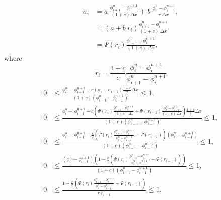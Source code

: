 \documentclass[../thesis.tex]{subfiles}
\begin{document}
\newpage
\begin{equation}
    \begin{split}
        \sigma_{i} &= a~\frac{\phi_{i+1}^{n}-\phi_{i}^{n+1}}{(1+c)\Delta x}
        + b~\frac{\phi_{i}^{n} - \phi_{i}^{n+1}}{c~\Delta x},
        \\
        &=\left( a + b~r_{i} \right)
        \frac{\phi_{i+1}^{n} - \phi_{i}^{n+1}}{(1+c)~\Delta x},
        \\
        &=\Psi(r_{i})\frac{\phi_{i+1}^{n} - \phi_{i}^{n+1}}{(1+c)~\Delta x},
    \end{split}
\end{equation}
where
\begin{equation}
    r_{i} = \frac{1+c}{c}
    \frac{\phi_{i}^{n} - \phi_{i}^{n+1}}
    {\phi_{i+1}^{n} - \phi_{i}^{n+1}}
\end{equation}
\begin{equation}
    \begin{split}
        0
        &\leq
        \frac{\phi_{i}^{n} - \phi_{i-1}^{n+1}
        -c\left(
            \sigma_{i} - \sigma_{i-1}
            \right)\frac{1+c}{2}\Delta x}
            {(1+c)\left( \phi_{i-1}^{n} - \phi_{i-1}^{n+1} \right)}
        \leq
        1,
        \\
        0
        &\leq
        \frac{\phi_{i}^{n} - \phi_{i-1}^{n+1}
        -c\left(
            \Psi(r_{i})\frac{\phi_{i+1}^{n} - \phi_{i}^{n+1}}{(1+c)~\Delta x}
            - \Psi(r_{i-1})\frac{\phi_{i}^{n} - \phi_{i-1}^{n+1}}{(1+c)~\Delta x}
            \right)\frac{1+c}{2}\Delta x}
            {(1+c)\left( \phi_{i-1}^{n} - \phi_{i-1}^{n+1} \right)}
        \leq
        1,
        \\
        0
        &\leq
        \frac{\phi_{i}^{n} - \phi_{i-1}^{n+1}
        -\frac{c}{2}\left(
            \Psi(r_{i})\frac{\phi_{i+1}^{n} - \phi_{i}^{n+1}}{\phi_{i}^{n} - \phi_{i-1}^{n+1}}
            - \Psi(r_{i-1})
            \right)
            \left( \phi_{i}^{n} - \phi_{i-1}^{n+1} \right)}
            {(1+c)\left( \phi_{i-1}^{n} - \phi_{i-1}^{n+1} \right)}
        \leq
        1,
        \\
        0
        &\leq
        \frac{\left( \phi_{i}^{n} - \phi_{i-1}^{n+1} \right)\left(
            1 - \frac{c}{2}\left(
            \Psi(r_{i})\frac{\phi_{i+1}^{n} - \phi_{i}^{n+1}}{\phi_{i}^{n} - \phi_{i-1}^{n+1}}
            - \Psi(r_{i-1})
            \right) \right)
            }
            {(1+c)\left( \phi_{i-1}^{n} - \phi_{i-1}^{n+1} \right)}
        \leq
        1,
        \\
        0
        &\leq
        \frac{1 - \frac{c}{2}\left(
            \Psi(r_{i})\frac{\phi_{i+1}^{n} - \phi_{i}^{n+1}}{\phi_{i}^{n} - \phi_{i-1}^{n+1}}
            - \Psi(r_{i-1})
            \right)
            }
            {c~r_{i-1}}
        \leq
        1,
    \end{split}
\end{equation}
\end{document}
